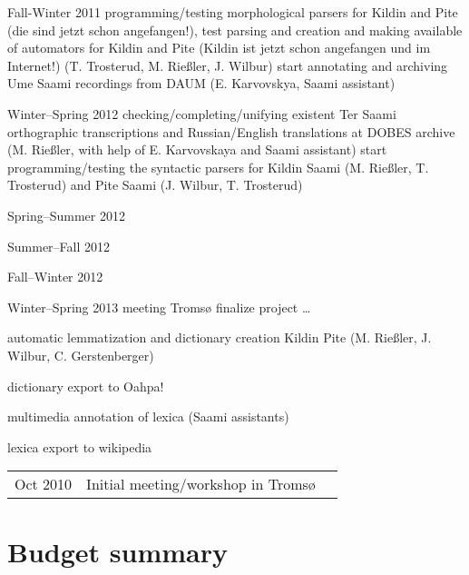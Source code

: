 \documentclass[a4paper,12pt]{article}
\begin{document}
Fall-Winter 2011
programming/testing morphological parsers for Kildin and Pite (die sind jetzt schon angefangen!), test parsing and creation and making available of automators for Kildin and Pite (Kildin ist jetzt schon angefangen und im Internet!)
(T. Trosterud, M. Rießler, J. Wilbur)
start annotating and archiving Ume Saami recordings from DAUM (E. Karvovskya, Saami assistant)

Winter–Spring 2012
checking/completing/unifying existent Ter Saami orthographic transcriptions and Russian/English translations at DOBES archive 
(M. Rießler, with help of E. Karvovskaya and Saami assistant)
start programming/testing the syntactic parsers for Kildin Saami (M. Rießler, T. Trosterud) and Pite Saami (J. Wilbur, T. Trosterud)

Spring–Summer 2012

Summer–Fall 2012

Fall–Winter 2012

Winter–Spring 2013
meeting Tromsø
finalize project
…

automatic lemmatization and dictionary creation Kildin Pite (M. Rießler, J. Wilbur, C. Gerstenberger)

dictionary export to Oahpa!

multimedia annotation of lexica (Saami assistants)

lexica export to wikipedia

\begin{longtable}{ l l l }
Oct 2010 & Initial meeting/workshop in Tromsø&\\
\end{longtable}

\section{Budget summary}
\end{document}

